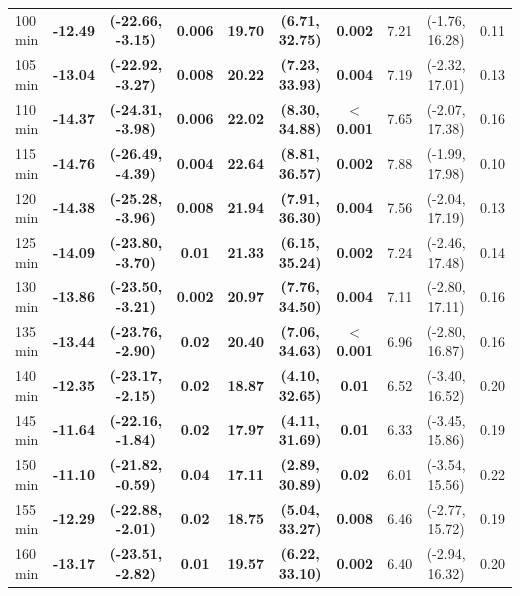 \begin{table}[ht]
{\begin{tabular}{lccccccccc}
100 min & \textbf{-12.49} & \textbf{(-22.66, -3.15)} & \textbf{0.006} & \textbf{19.70} & \textbf{(6.71, 32.75)} & \textbf{0.002} & 7.21 & (-1.76, 16.28) & 0.11 \\
105 min & \textbf{-13.04} & \textbf{(-22.92, -3.27)} & \textbf{0.008} & \textbf{20.22} & \textbf{(7.23, 33.93)} & \textbf{0.004} & 7.19 & (-2.32, 17.01) & 0.13 \\
110 min & \textbf{-14.37} & \textbf{(-24.31, -3.98)} & \textbf{0.006} & \textbf{22.02} & \textbf{(8.30, 34.88)} & \textbf{$<$0.001} & 7.65 & (-2.07, 17.38) & 0.16 \\
115 min & \textbf{-14.76} & \textbf{(-26.49, -4.39)} & \textbf{0.004} & \textbf{22.64} & \textbf{(8.81, 36.57)} & \textbf{0.002} & 7.88 & (-1.99, 17.98) & 0.10 \\
120 min & \textbf{-14.38} & \textbf{(-25.28, -3.96)} & \textbf{0.008} & \textbf{21.94} & \textbf{(7.91, 36.30)} & \textbf{0.004} & 7.56 & (-2.04, 17.19) & 0.13 \\
125 min & \textbf{-14.09} & \textbf{(-23.80, -3.70)} & \textbf{0.01} & \textbf{21.33} & \textbf{(6.15, 35.24)} & \textbf{0.002} & 7.24 & (-2.46, 17.48) & 0.14 \\
130 min & \textbf{-13.86} & \textbf{(-23.50, -3.21)} & \textbf{0.002} & \textbf{20.97} & \textbf{(7.76, 34.50)} & \textbf{0.004} & 7.11 & (-2.80, 17.11) & 0.16 \\
135 min & \textbf{-13.44} & \textbf{(-23.76, -2.90)} & \textbf{0.02} & \textbf{20.40} & \textbf{(7.06, 34.63)} & \textbf{$<$0.001} & 6.96 & (-2.80, 16.87) & 0.16 \\
140 min & \textbf{-12.35} & \textbf{(-23.17, -2.15)} & \textbf{0.02} & \textbf{18.87} & \textbf{(4.10, 32.65)} & \textbf{0.01} & 6.52 & (-3.40, 16.52) & 0.20 \\
145 min & \textbf{-11.64} & \textbf{(-22.16, -1.84)} & \textbf{0.02} & \textbf{17.97} & \textbf{(4.11, 31.69)} & \textbf{0.01} & 6.33 & (-3.45, 15.86) & 0.19 \\
150 min & \textbf{-11.10} & \textbf{(-21.82, -0.59)} & \textbf{0.04} & \textbf{17.11} & \textbf{(2.89, 30.89)} & \textbf{0.02} & 6.01 & (-3.54, 15.56) & 0.22 \\
155 min & \textbf{-12.29} & \textbf{(-22.88, -2.01)} & \textbf{0.02} & \textbf{18.75} & \textbf{(5.04, 33.27)} & \textbf{0.008} & 6.46 & (-2.77, 15.72) & 0.19 \\
160 min & \textbf{-13.17} & \textbf{(-23.51, -2.82)} & \textbf{0.01} & \textbf{19.57} & \textbf{(6.22, 33.10)} & \textbf{0.002} & 6.40 & (-2.94, 16.32) & 0.20 \\

\end{tabular}}
\end{table}
